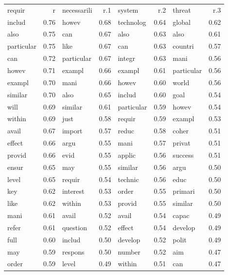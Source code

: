 \documentclass[11pt,article,oneside]{memoir}
\begin{document}
\begin{longtable}[c]{@{}lrlrlrlr@{}}
\toprule\addlinespace
requir & r & necessarili & r.1 & system & r.2 & threat & r.3
\\\addlinespace
\midrule\endhead
includ & 0.76 & howev & 0.68 & technolog & 0.64 & global & 0.62
\\\addlinespace
also & 0.75 & can & 0.67 & also & 0.63 & also & 0.61
\\\addlinespace
particular & 0.75 & like & 0.67 & can & 0.63 & countri & 0.57
\\\addlinespace
can & 0.72 & particular & 0.67 & integr & 0.63 & mani & 0.56
\\\addlinespace
howev & 0.71 & exampl & 0.66 & exampl & 0.61 & particular & 0.56
\\\addlinespace
exampl & 0.70 & mani & 0.66 & howev & 0.60 & world & 0.56
\\\addlinespace
similar & 0.70 & also & 0.65 & includ & 0.60 & goal & 0.54
\\\addlinespace
will & 0.69 & similar & 0.61 & particular & 0.59 & howev & 0.54
\\\addlinespace
within & 0.69 & just & 0.58 & requir & 0.59 & exampl & 0.53
\\\addlinespace
avail & 0.67 & import & 0.57 & reduc & 0.58 & coher & 0.51
\\\addlinespace
effect & 0.66 & argu & 0.55 & mani & 0.57 & privat & 0.51
\\\addlinespace
provid & 0.66 & evid & 0.55 & applic & 0.56 & success & 0.51
\\\addlinespace
ensur & 0.65 & may & 0.55 & similar & 0.56 & argu & 0.50
\\\addlinespace
level & 0.65 & requir & 0.54 & technic & 0.56 & educ & 0.50
\\\addlinespace
key & 0.62 & interest & 0.53 & order & 0.55 & primari & 0.50
\\\addlinespace
like & 0.62 & within & 0.53 & provid & 0.55 & similar & 0.50
\\\addlinespace
mani & 0.61 & avail & 0.52 & avail & 0.54 & capac & 0.49
\\\addlinespace
refer & 0.61 & question & 0.52 & effect & 0.54 & develop & 0.49
\\\addlinespace
full & 0.60 & includ & 0.50 & develop & 0.52 & polit & 0.49
\\\addlinespace
may & 0.59 & respons & 0.50 & number & 0.52 & aim & 0.47
\\\addlinespace
order & 0.59 & level & 0.49 & within & 0.51 & can & 0.47

\end{longtable}
\end{document}
